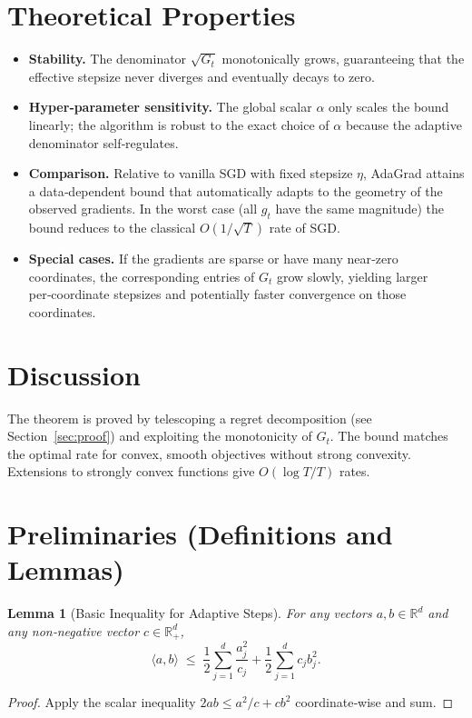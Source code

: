 \documentclass[11pt]{article}
\newtheorem{lemma}{Lemma}
\newcommand{\R}{\mathbb{R}}
\newcommand{\inner}[2]{\langle #1,#2\rangle}
\begin{document}
\section*{Theoretical Properties}
\begin{itemize}[leftmargin=*]
\item \textbf{Stability.} The denominator $\sqrt{G_{t}}$ monotonically grows, guaranteeing that the effective stepsize never diverges and eventually decays to zero.
\item \textbf{Hyper‑parameter sensitivity.} The global scalar $\alpha$ only scales the bound linearly; the algorithm is robust to the exact choice of $\alpha$ because the adaptive denominator self‑regulates.
\item \textbf{Comparison.} Relative to vanilla SGD with fixed stepsize $\eta$, AdaGrad attains a data‑dependent bound that automatically adapts to the geometry of the observed gradients. In the worst case (all $g_{t}$ have the same magnitude) the bound reduces to the classical $O(1/\sqrt{T})$ rate of SGD.
\item \textbf{Special cases.} If the gradients are sparse or have many near‑zero coordinates, the corresponding entries of $G_{t}$ grow slowly, yielding larger per‑coordinate stepsizes and potentially faster convergence on those coordinates.
\end{itemize}

\section*{Discussion}
The theorem is proved by telescoping a regret decomposition (see Section~\ref{sec:proof}) and exploiting the monotonicity of $G_{t}$. The bound matches the optimal rate for convex, smooth objectives without strong convexity. Extensions to strongly convex functions give $O(\log T/T)$ rates.

\section*{Preliminaries (Definitions and Lemmas)}\label{sec:prelim}
\begin{lemma}[Basic Inequality for Adaptive Steps]\label{lem:basic}
For any vectors $a,b\in\R^{d}$ and any non‑negative vector $c\in\R^{d}_{+}$,
\[
\inner{a}{b}\;\le\;\frac12\sum_{j=1}^{d}\frac{a_{j}^{2}}{c_{j}}+\frac12\sum_{j=1}^{d}c_{j}b_{j}^{2}.
\tag{3}
\]
\end{lemma}
\begin{proof}
Apply the scalar inequality $2ab\le a^{2}/c + cb^{2}$ coordinate‑wise and sum.
\end{proof}
\end{document}
